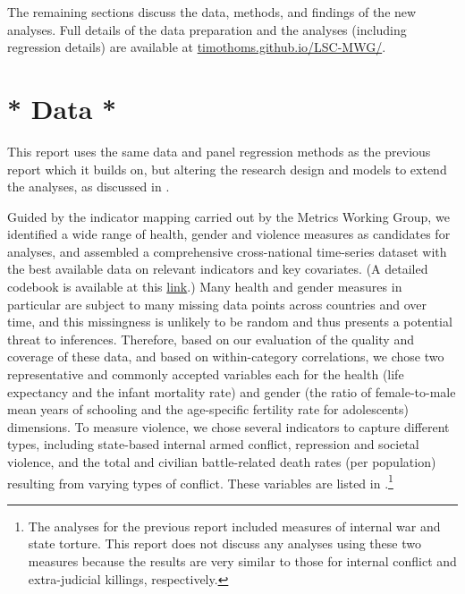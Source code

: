 \documentclass[12pt]{article}
\begin{document}
The remaining sections discuss the data, methods, and findings of the new analyses. Full details of the data preparation and the analyses (including regression details) are available at \href{https://timothoms.github.io/LSC-MWG/}{timothoms.github.io/LSC-MWG/}.

\section{* Data *}
\label{data}

This report uses the same data and panel regression methods as the previous report which it builds on, but altering the research design and models to extend the analyses, as discussed in .

Guided by the indicator mapping carried out by the Metrics Working Group, we identified a wide range of health, gender and violence measures as candidates for analyses, and assembled a comprehensive cross-national time-series dataset with the best available data on relevant indicators and key covariates. (A detailed codebook is available at this \href{https://docs.google.com/spreadsheets/d/1KLFTva--XHVBM-IX6qaPtuyzmIlRMnpyjUXfBdJPsag/edit?usp=sharing}{link}.)
Many health and gender measures in particular are subject to many missing data points across countries and over time, and this missingness is unlikely to be random and thus presents a potential threat to inferences. Therefore, based on our evaluation of the quality and coverage of these data, and based on within-category correlations, we chose two representative and commonly accepted variables each for the health (life expectancy and the infant mortality rate) and gender (the ratio of female-to-male mean years of schooling and the age-specific fertility rate for adolescents) dimensions.
To measure violence, we chose several indicators to capture different types, including state-based internal armed conflict, repression and societal violence, and the total and civilian battle-related death rates (per population) resulting from varying types of conflict.
These variables are listed in .\footnote{The analyses for the previous report included measures of internal war and state torture. This report does not discuss any analyses using these two measures because the results are very similar to those for internal conflict and extra-judicial killings, respectively.}


\end{document}
